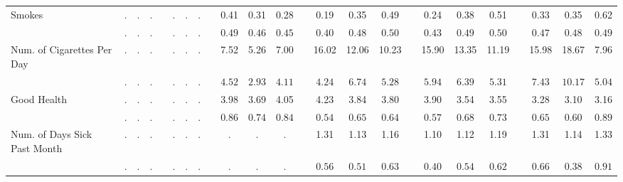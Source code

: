 \begin{center}
{\begin{longtable}{L{12em} c c c p{1.2em} c c c p{1.2em} c c c p{1.2em} c c c p{1.2em} c c c p{1.2em} c c c}
Smokes & . &         . &         . & &         . &         . &         . & &      0.41 &      0.31 &      0.28 & &      0.19 &      0.35 &      0.49 & &      0.24 &      0.38 &      0.51 & &      0.33 &      0.35 &      0.62 \\*
& $\mathit{        .}$ & $\mathit{        .}$ & $\mathit{        .}$ & & $\mathit{        .}$ & $\mathit{        .}$ & $\mathit{        .}$ & & $\mathit{     0.49}$ & $\mathit{     0.46}$ & $\mathit{     0.45}$ & & $\mathit{     0.40}$ & $\mathit{     0.48}$ & $\mathit{     0.50}$ & & $\mathit{     0.43}$ & $\mathit{     0.49}$ & $\mathit{     0.50}$ & & $\mathit{     0.47}$ & $\mathit{     0.48}$ & $\mathit{     0.49}$ \\[.7em]
Num. of Cigarettes Per Day & . &         . &         . & &         . &         . &         . & &      7.52 &      5.26 &      7.00 & &     16.02 &     12.06 &     10.23 & &     15.90 &     13.35 &     11.19 & &     15.98 &     18.67 &      7.96 \\*
& $\mathit{        .}$ & $\mathit{        .}$ & $\mathit{        .}$ & & $\mathit{        .}$ & $\mathit{        .}$ & $\mathit{        .}$ & & $\mathit{     4.52}$ & $\mathit{     2.93}$ & $\mathit{     4.11}$ & & $\mathit{     4.24}$ & $\mathit{     6.74}$ & $\mathit{     5.28}$ & & $\mathit{     5.94}$ & $\mathit{     6.39}$ & $\mathit{     5.31}$ & & $\mathit{     7.43}$ & $\mathit{    10.17}$ & $\mathit{     5.04}$ \\[.7em]
Good Health & . &         . &         . & &         . &         . &         . & &      3.98 &      3.69 &      4.05 & &      4.23 &      3.84 &      3.80 & &      3.90 &      3.54 &      3.55 & &      3.28 &      3.10 &      3.16 \\*
& $\mathit{        .}$ & $\mathit{        .}$ & $\mathit{        .}$ & & $\mathit{        .}$ & $\mathit{        .}$ & $\mathit{        .}$ & & $\mathit{     0.86}$ & $\mathit{     0.74}$ & $\mathit{     0.84}$ & & $\mathit{     0.54}$ & $\mathit{     0.65}$ & $\mathit{     0.64}$ & & $\mathit{     0.57}$ & $\mathit{     0.68}$ & $\mathit{     0.73}$ & & $\mathit{     0.65}$ & $\mathit{     0.60}$ & $\mathit{     0.89}$ \\[.7em]
Num. of Days Sick Past Month & . &         . &         . & &         . &         . &         . & &         . &         . &         . & &      1.31 &      1.13 &      1.16 & &      1.10 &      1.12 &      1.19 & &      1.31 &      1.14 &      1.33 \\*
& $\mathit{        .}$ & $\mathit{        .}$ & $\mathit{        .}$ & & $\mathit{        .}$ & $\mathit{        .}$ & $\mathit{        .}$ & & $\mathit{        .}$ & $\mathit{        .}$ & $\mathit{        .}$ & & $\mathit{     0.56}$ & $\mathit{     0.51}$ & $\mathit{     0.63}$ & & $\mathit{     0.40}$ & $\mathit{     0.54}$ & $\mathit{     0.62}$ & & $\mathit{     0.66}$ & $\mathit{     0.38}$ & $\mathit{     0.91}$ \\[.7em]

\end{longtable}}
\end{center}
